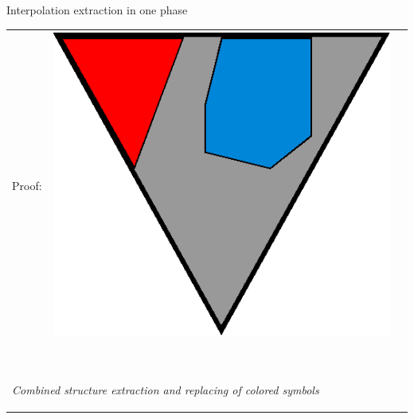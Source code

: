 \documentclass[final,compress]{beamer}
\begin{document}
\newcommand{\onePhaseArrowLabel}{Combined structure extraction and replacing of colored symbols}

\subsection{}
\begin{frame}{Interpolation extraction in one phase}
	\small
	\begin{tabular}{p{}ll}

		Proof: 
		&

		\multicolumn{1}{m{\fakemulticolwidth}}{
			\includegraphics[width=\proofwidth]{figures/two_phase_draft_proof}
		}
		&
		\vspace*{0.2em}
		\\

		\multicolumn{2}{l}{
			\proofindent{\stagearrow} ~\parbox[c]{15em}{\raggedright\emph{ \onePhaseArrowLabel } }
			\vspace*{0.2em}
		}
		\\


\end{tabular}
\end{frame}
\end{document}
